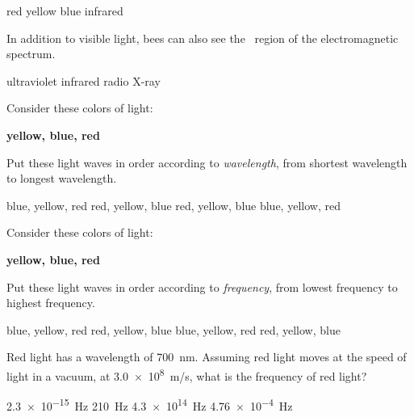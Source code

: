 \documentclass{exam}
\begin{document}
\begin{questions}
\begin{choices}
\choice red
\choice yellow
\correctchoice blue
\choice infrared
\end{choices}



\clearpage


\question
In addition to visible light, bees can also see the \fillin\ region of the electromagnetic spectrum. 

\begin{choices}
\correctchoice ultraviolet
\choice infrared
\choice radio
\choice X-ray
\end{choices}


\question %
Consider these colors of light: 

\begin{center}
    \textbf{yellow, blue, red}
\end{center}


Put these light waves in order according to \textit{wavelength}, from shortest wavelength to longest wavelength.

\begin{choices}
\choice blue, yellow, red
\choice red, yellow, blue
\choice red, yellow, blue
\CorrectChoice blue, yellow, red
\end{choices}


\question %
Consider these colors of light: 

\begin{center}
    \textbf{yellow, blue, red}
\end{center}

Put these light waves in order according to \textit{frequency}, from lowest frequency to highest frequency.

\begin{choices}
\choice blue, yellow, red
\choice red, yellow, blue
\choice blue, yellow, red
\CorrectChoice red, yellow, blue
\end{choices}

\question
Red light has a wavelength of \SI{700}{nm}. Assuming red light moves at the speed of light in a vacuum, at \SI{3.0e8}{m/s}, what is the frequency of red light?

\begin{choices}
\choice \SI{2.3e-15}{Hz}
\choice \SI{210}{Hz}
\correctchoice \SI{4.3e14}{Hz}
\choice \SI{4.76e-4}{Hz}
\end{choices}


\end{questions}
\end{document}
